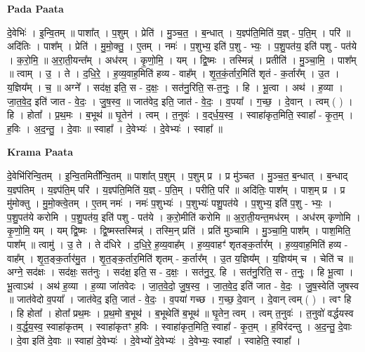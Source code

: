 \documentclass[17pt]{extarticle}
\begin{document}
\textbf{Pada Paata} \newline

दे॒वेभिः॑ । इ॒न्वि॒तम् ॥ पाशा᳚त् । प॒शुम् । प्रेति॑ । मु॒ञ्च॒त॒ । ब॒न्धात् । य॒ज्ञ्प॑ति॒मिति॑ य॒ज्ञ् - प॒ति॒म् । परि॑ ॥ अदि॑तिः । पाश᳚म् । प्रेति॑ । मु॒मो॒क्तु॒ । ए॒तम् । नमः॑ । प॒शुभ्य॒ इति॑ प॒शु - भ्यः॒ । प॒शु॒पत॑य॒ इति॑ पशु - पत॑ये । क॒रो॒मि॒ ॥ अ॒रा॒ती॒यन्त᳚म् । अध॑रम् । कृ॒णो॒मि॒ । यम् । द्वि॒ष्मः । तस्मिन्न्॑ । प्रतीति॑ । मु॒ञ्चा॒मि॒ । पाश᳚म् ॥ त्वाम् । उ॒ । ते । द॒धि॒रे॒ । ह॒व्य॒वाह॒मिति॑ हव्य - वाह᳚म् । शृ॒त॒कं॒र्तार॒मिति॑ शृतं - क॒र्तार᳚म् । उ॒त । य॒ज्ञिय᳚म् । च॒ ॥ अग्ने᳚ । सद॑क्ष॒ इति॒ स - द॒क्षः॒ । सत॑नु॒रिति॒ स-त॒नुः॒ । हि । भू॒त्वा । अथ॑ । ह॒व्या । जा॒त॒वे॒द॒ इति॑ जात - वे॒दः॒ । जु॒ष॒स्व॒ ॥ जात॑वेद॒ इति॒ जात॑ - वे॒दः॒ । व॒पया᳚ । ग॒च्छ॒ । दे॒वान् । त्वम् ( ) । हि । होता᳚ । प्र॒थ॒मः । ब॒भूथ॑ ॥ घृ॒तेन॑ । त्वम् । त॒नुवः॑ । व॒द्‌र्ध॒य॒स्व॒ । स्वाहा॑कृत॒मिति॒ स्वाहा᳚ - कृ॒त॒म् । ह॒विः । अ॒द॒न्तु॒ । दे॒वाः ॥ स्वाहा᳚ । दे॒वेभ्यः॑ । दे॒वेभ्यः॑ । स्वाहा᳚ ॥  \newline


\textbf{Krama Paata} \newline

दे॒वेभि॑रिन्वि॒तम् । इ॒न्वि॒तमिती᳚न्वि॒तम् ॥ पाशा᳚त् प॒शुम् । प॒शुम् प्र । प्र मु॑ञ्चत । मु॒ञ्च॒त॒ ब॒न्धात् । ब॒न्धाद् य॒ज्ञ्प॑तिम् । य॒ज्ञ्प॑ति॒म् परि॑ । य॒ज्ञ्प॑ति॒मिति॑ य॒ज्ञ् - प॒ति॒म् । परीति॒ परि॑ ॥ अदि॑तिः॒ पाश᳚म् । पाश॒म् प्र । प्र मु॑मोक्तु । मु॒मो॒क्त्वे॒तम् । ए॒तम् नमः॑ । नमः॑ प॒शुभ्यः॑ । प॒शुभ्यः॑ पशु॒पत॑ये । प॒शुभ्य॒ इति॑ प॒शु - भ्यः॒ । प॒शु॒पत॑ये करोमि । प॒शु॒पत॑य॒ इति॑ पशु - पत॑ये । क॒रो॒मीति॑ करोमि ॥ अ॒रा॒ती॒यन्त॒मध॑रम् । अध॑रम् कृणोमि । कृ॒णो॒मि॒ यम् । यम् द्वि॒ष्मः । द्वि॒ष्मस्तस्मिन्न्॑ । तस्मि॒न् प्रति॑ । प्रति॑ मुञ्चामि । मु॒ञ्चा॒मि॒ पाश᳚म् । पाश॒मिति॒ पाश᳚म् ॥ त्वामु॑ । उ॒ ते । ते द॑धिरे । द॒धि॒रे॒ ह॒व्य॒वाह᳚म् । ह॒व्य॒वाहꣳ॑ शृतङ्क॒र्तार᳚म् । ह॒व्य॒वाह॒मिति॑ हव्य - वाह᳚म् । शृ॒त॒ङ्क॒र्तार॑मु॒त । शृ॒त॒ङ्क॒र्तार॒मिति॑ शृतम् - क॒र्तार᳚म् । उ॒त य॒ज्ञिय᳚म् । य॒ज्ञिय॑म् च । चेति॑ च ॥ अग्ने॒ सद॑क्षः । सद॑क्षः॒ सत॑नुः । सद॑क्ष॒ इति॒ स - द॒क्षः॒ । सत॑नु॒र्॒. हि । सत॑नु॒रिति॒ स - त॒नुः॒ । हि भू॒त्वा । भू॒त्वाऽथ॑ । अथ॑ ह॒व्या । ह॒व्या जा॑तवेदः । जा॒त॒वे॒दो॒ जु॒ष॒स्व॒ । जा॒त॒वे॒द॒ इति॑ जात - वे॒दः॒ । जु॒ष॒स्वेति॑ जुषस्व ॥ जात॑वेदो व॒पया᳚ । जात॑वेद॒ इति॒ जात॑ - वे॒दः॒ । व॒पया॑ गच्छ । ग॒च्छ॒ दे॒वान् । दे॒वान् त्वम् ( ) । त्वꣳ हि । हि होता᳚ । होता᳚ प्रथ॒मः । प्र॒थ॒मो ब॒भूथ॑ । ब॒भूथेति॑ ब॒भूथ॑ ॥ घृ॒तेन॒ त्वम् । त्वम् त॒नुवः॑ । त॒नुवो॑ वर्द्धयस्व । व॒र्द्ध॒य॒स्व॒ स्वाहा॑कृतम् । स्वाहा॑कृतꣳ ह॒विः । स्वाहा॑कृत॒मिति॒ स्वाहा᳚ - कृ॒त॒म् । ह॒विर॑दन्तु । अ॒द॒न्तु॒ दे॒वाः । दे॒वा इति॑ दे॒वाः ॥ स्वाहा॑ दे॒वेभ्यः॑ । दे॒वेभ्यो॑ दे॒वेभ्यः॑ । दे॒वेभ्यः॒ स्वाहा᳚ । स्वाहेति॒ स्वाहा᳚ । \newline
\end{document}
